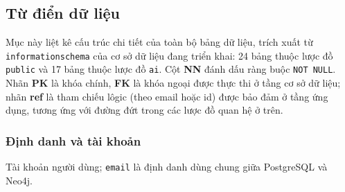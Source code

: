 \subsection{Từ điển dữ liệu}
\label{sec:appendix-a-datadict}

\newcommand{\cn}[1]{\texttt{#1}}
\begingroup
\renewcommand{\_}{\textunderscore\allowbreak}
\sloppy %

Mục này liệt kê cấu trúc chi tiết của toàn bộ bảng dữ liệu, trích xuất từ
\texttt{information\_schema} của cơ sở dữ liệu đang triển khai: 24 bảng thuộc
lược đồ \texttt{public} và 17 bảng thuộc lược đồ \texttt{ai}. Cột \textbf{NN}
đánh dấu ràng buộc \texttt{NOT NULL}. Nhãn \textbf{PK} là khóa chính,
\textbf{FK} là khóa ngoại được thực thi ở tầng cơ sở dữ liệu; nhãn \textbf{ref}
là tham chiếu lôgic (theo email hoặc id) được bảo đảm ở tầng ứng dụng, tương ứng
với đường đứt trong các lược đồ quan hệ ở trên.

\subsubsection{Định danh và tài khoản}

Tài khoản người dùng; \cn{email} là định danh dùng chung giữa PostgreSQL và Neo4j.

